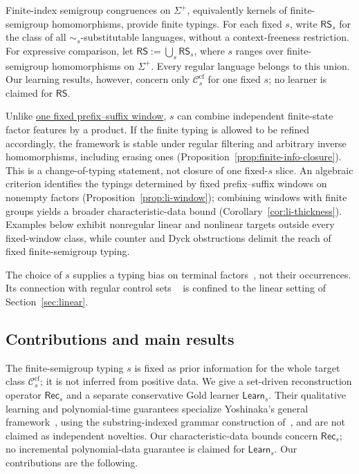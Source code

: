 \documentclass[11pt,a4paper]{article}
\theoremstyle{remark}
\theoremstyle{plain}
\newcommand{\cf}{\mathrm{cf}}
\newcommand{\Ccf}[1]{\mathcal C_{#1}^{\cf}}
\begin{document}
Finite-index semigroup congruences on $\Sigma^+$,
equivalently kernels of finite-semigroup homomorphisms,
provide finite typings.  For each fixed $s$,
write $\mathsf{RS}_s$ for the class of all $\sim_s$-substitutable
languages, without a context-freeness restriction.  For expressive
comparison, let
$\mathsf{RS}:=\bigcup_s\mathsf{RS}_s$,
where $s$ ranges over finite-semigroup homomorphisms on $\Sigma^+$.
Every regular language belongs to this union.  Our learning results,
however, concern only $\Ccf{s}$ for one fixed $s$; no learner is
claimed for $\mathsf{RS}$.

Unlike \hyperlink{def:kl-subst}{one fixed prefix--suffix window}, $s$ can combine independent
finite-state factor features by a product.  If the finite typing is allowed
to be refined accordingly, the framework is stable under regular filtering
and arbitrary inverse homomorphisms, including erasing ones
(Proposition~\ref{prop:finite-info-closure}).  This is a
change-of-typing statement, not closure of one fixed-$s$ slice.  An algebraic criterion identifies the typings determined by fixed
prefix--suffix windows on nonempty factors
(Proposition~\ref{prop:li-window}); combining windows with finite groups
yields a broader characteristic-data bound (Corollary~\ref{cor:li-thickness}).
Examples below exhibit nonregular linear and nonlinear targets
outside every fixed-window class, while counter and Dyck obstructions
delimit the reach of fixed finite-semigroup typing.

The choice of $s$ supplies a typing bias on terminal
factors~\cite{coste-typing2004}, not their occurrences.
Its connection with regular control sets
~\cite{takada1988,takada1995} is confined to
the linear setting of Section~\ref{sec:linear}.

\subsection{Contributions and main results}

The finite-semigroup typing $s$ is fixed as prior information
for the whole target class $\Ccf{s}$; it is not inferred
from positive data. We give a set-driven reconstruction operator
$\mathsf{Rec}_s$ and a separate conservative Gold learner
$\mathsf{Learn}_s$. Their qualitative learning and
polynomial-time guarantees specialize Yoshinaka's general
framework~\cite{yoshinaka2015}, using the substring-indexed
grammar construction of~\cite{yoshinaka2008}, and are not
claimed as independent novelties. Our characteristic-data
bounds concern $\mathsf{Rec}_s$; no incremental
polynomial-data guarantee is claimed for $\mathsf{Learn}_s$.
Our contributions are the following.
\end{document}
